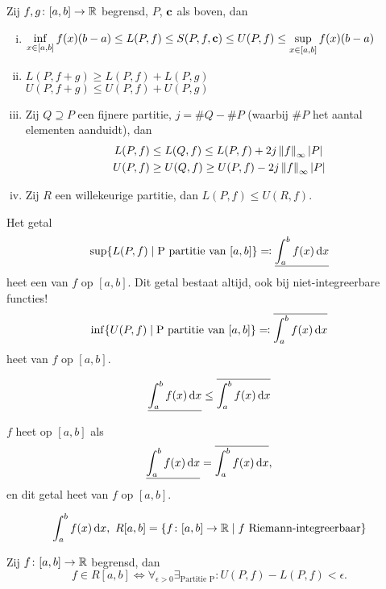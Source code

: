 \documentclass{2wa40summary}
\begin{document}
			\begin{lemma}
				Zij $ f,g\colon [a,b] \to \mathbb{R} $ begrensd, $P$, ${\textbf{c}}$ als boven, dan
				\begin{enumerate}[(i)]
					\item $\displaystyle \inf_{x\in [a,b]} f(x) (b-a) \le L(P,f) \le S(P,f,{\textbf{c}}) \le U(P,f) \le \sup_{x \in [a,b]} f(x) (b-a) $
					\item $L(P,f+g) \ge L(P,f) + L(P,g)$ \\
					$U(P,f+g) \le U(P,f) + U(P,g)$
					\item Zij $Q \supseteq P$ een fijnere partitie, $ j = \#Q -\#P $ (waarbij $\#P$ het aantal elementen aanduidt), dan 
					\[ 
						\begin{split}
							L(P,f) &\le L(Q,f) \le L(P,f) + 2j \left\|f\right\|_\infty {\left|P\right|} \\
							U(P,f) &\ge U(Q,f) \ge U(P,f) - 2j \left\|f\right\|_\infty {\left|P\right|}
						\end{split}
					 \]
					 \item Zij $R$ een willekeurige partitie, dan $ L(P,f) \le U(R,f). $
				\end{enumerate}
			\end{lemma}
			\begin{define}
				 Het getal \[ \sup \{ L(P,f) \mid \text{P partitie van }[a,b] \} \eqqcolon  \underline{\int_{a}^{b} f(x) \mathop{}\!\mathrm{d} x} \]
				 heet een  van $f$ op $[a,b]$.
				 \opm Dit getal bestaat altijd, ook bij niet-integreerbare functies!
				 \[ 
					 \inf \{ U(P,f) \mid \text{P partitie van }[a,b] \} \eqqcolon  \overline{\int_{a}^{b} f(x) \mathop{}\!\mathrm{d} x}
				  \]
				  heet  van $f$ op $[a,b]$.
			\end{define}
			\begin{gevolg}
				\[ \underline{\int_{a}^{b} f(x) \mathop{}\!\mathrm{d} x} \le \overline{\int_{a}^{b} f(x) \mathop{}\!\mathrm{d} x} \]
			\end{gevolg}
			\begin{define}
				$f$ heet  op $[a,b]$ als 
				\[ \underline{\int_{a}^{b} f(x) \mathop{}\!\mathrm{d} x} = \overline{\int_{a}^{b} f(x) \mathop{}\!\mathrm{d} x}, \]
				en dit getal heet  van $f$ op $[a,b]$.
				\begin{nota}
					\[
					\int_{a}^{b} f(x) \mathop{}\!\mathrm{d} x,\ R[a,b] = \{ f\colon [a,b]\to \mathbb{R} \mid f \text{ Riemann-integreerbaar} \}
					\]
				\end{nota}
			\end{define}
			
			\begin{theorem}
				Zij $ f\colon [a,b] \to \mathbb{R} $ begrensd, dan
				\[ 
					f \in R[a,b] \iff \forall_{\epsilon >0} \exists_{\text{Partitie P}}: U(P,f) - L(P,f) < \epsilon.
				 \]
			\end{theorem}
			
\end{document}
